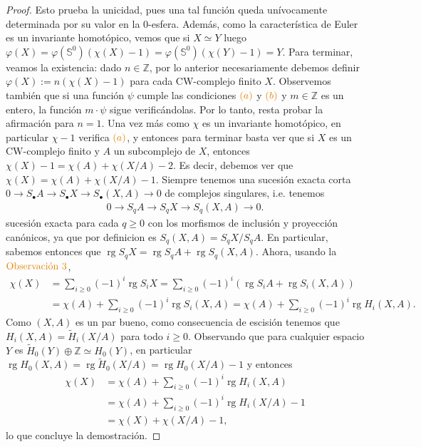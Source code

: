 \documentclass[11pt]{article}
\newcommand{\Z}{\mathbb{Z}}
\newcommand{\Ss}{\mathbb{S}}
\newcommand{\rg}{\operatorname{rg}}
\newcommand{\paint}[2]{\color{#1}{#2}}
\begin{document}
\begin{proof}
Esto prueba la unicidad, pues una tal funci\'on queda un\'ivocamente determinada por su valor en la $0$-esfera. Adem\'as, como la caracter\'istica de Euler es un invariante homot\'opico, vemos que si $X \simeq Y$ luego $\varphi(X) = \varphi(\Ss^0)(\chi(X)-1) = \varphi(\Ss^0)(\chi(Y)-1) = Y$. Para terminar, veamos la existencia: dado $n \in \Z$, por lo anterior necesariamente debemos definir $\varphi(X) := n(\chi(X)-1)$ para cada CW-complejo finito $X$. Observemos tambi\'en que si una funci\'on $\psi$ cumple las condiciones $\paint{orange}{(a)}$ y $\paint{orange}{(b)}$ y $m \in \Z$ es un entero, la funci\'on $m \cdot \psi$ sigue verific\'andolas. Por lo tanto, resta probar la afirmaci\'on para $n = 1$. Una vez m\'as como $\chi$ es un invariante homot\'opico, en particular $\chi -1$ verifica $\paint{orange}{(a)}$, y entonces para terminar basta ver que si $X$ es un CW-complejo finito y $A$ un subcomplejo de $X$, entonces $\chi(X) -1 = \chi(A) + \chi(X/A) -2$. Es decir, debemos ver que $\chi(X) = \chi(A) + \chi(X/A) -1$. Siempre tenemos una sucesi\'on exacta corta $0 \to S_\bullet A \to S_\bullet X \to S_\bullet(X,A) \to 0$ de complejos singulares, i.e. tenemos 
\begin{align*}
0 \to S_q A \to S_q X \to S_q(X,A) \to 0.
\end{align*}
sucesi\'on exacta para cada $q \geq 0$ con los morfismos de inclusi\'on y proyecci\'on can\'onicos, ya que por definicion es $S_q(X,A) = S_qX/S_qA$. En particular, sabemos entonces que $\rg S_qX = \rg S_qA + \rg S_q(X,A)$. Ahora, usando la $\paint{orange}{\text{Observaci\'on $3$}}$,
\begin{align*}
\chi(X) &= \sum_{i \geq 0}(-1)^i \rg S_iX = \sum_{i \geq 0}(-1)^i(\rg S_iA + \rg S_i(X,A))\\
&= \chi(A) + \sum_{i \geq 0}(-1)^i\rg S_i(X,A) = \chi(A) + \sum_{i \geq 0}(-1)^i\rg H_i(X,A).
\end{align*}
Como $(X,A)$ es un par bueno, como consecuencia de escisi\'on tenemos que $H_i(X,A) = \tilde{H}_i(X/A)$ para todo $i \geq 0$. Observando que para cualquier espacio $Y$ es $\tilde{H}_0(Y) \oplus \Z \simeq H_0(Y)$, en particular $\rg H_0(X,A) = \rg \tilde{H}_0(X/A) = \rg H_0(X/A) -1$ y entonces
\begin{align*}
\chi(X) &= \chi(A) + \sum_{i \geq 0}(-1)^i\rg H_i(X,A)\\
&= \chi(A) + \sum_{i \geq 0}(-1)^i\rg H_i(X/A) - 1\\
&= \chi(X) + \chi(X/A) -1,
\end{align*}
lo que concluye la demostraci\'on.
\end{proof}
\end{document}
